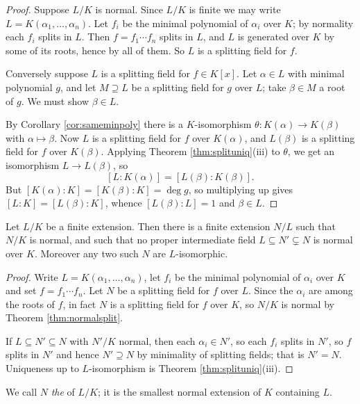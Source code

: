 \documentclass[a4paper]{scrartcl}
\begin{document}
\begin{proof}
	Suppose $L/K$ is normal. Since $L/K$ is finite we may write $L = K(\alpha_1, \dots, \alpha_n)$. Let $f_i$ be the minimal polynomial of $\alpha_i$ over $K$; by normality each $f_i$ splits in $L$. Then $f = f_1 \cdots f_n$ splits in $L$, and $L$ is generated over $K$ by some of its roots, hence by all of them. So $L$ is a splitting field for $f$.

	Conversely suppose $L$ is a splitting field for $f \in K[x]$. Let $\alpha \in L$ with minimal polynomial $g$, and let $M \supseteq L$ be a splitting field for $g$ over $L$; take $\beta \in M$ a root of $g$. We must show $\beta \in L$.

	By Corollary \ref{cor:sameminpoly} there is a $K$-isomorphism $\theta : K(\alpha) \to K(\beta)$ with $\alpha \mapsto \beta$. Now $L$ is a splitting field for $f$ over $K(\alpha)$, and $L(\beta)$ is a splitting field for $f$ over $K(\beta)$. Applying Theorem \ref{thm:splituniq}(iii) to $\theta$, we get an isomorphism $L \to L(\beta)$, so
	$$[L : K(\alpha)] = [L(\beta):K(\beta)].$$
	But $[K(\alpha):K] = [K(\beta):K] = \deg g$, so multiplying up gives $[L:K] = [L(\beta):K]$, whence $[L(\beta):L] = 1$ and $\beta \in L$.
\end{proof}

\begin{corollary}\label{cor:normalclosure}
	Let $L/K$ be a finite extension. Then there is a finite extension $N/L$ such that $N/K$ is normal, and such that no proper intermediate field $L \subseteq N' \subsetneq N$ is normal over $K$. Moreover any two such $N$ are $L$-isomorphic.
\end{corollary}

\begin{proof}
	Write $L = K(\alpha_1, \dots, \alpha_n)$, let $f_i$ be the minimal polynomial of $\alpha_i$ over $K$ and set $f = f_1\cdots f_n$. Let $N$ be a splitting field for $f$ over $L$. Since the $\alpha_i$ are among the roots of $f$, in fact $N$ is a splitting field for $f$ over $K$, so $N/K$ is normal by Theorem \ref{thm:normalsplit}.

	If $L \subseteq N' \subseteq N$ with $N'/K$ normal, then each $\alpha_i \in N'$, so each $f_i$ splits in $N'$, so $f$ splits in $N'$ and hence $N' \supseteq N$ by minimality of splitting fields; that is $N' = N$. Uniqueness up to $L$-isomorphism is Theorem \ref{thm:splituniq}(iii).
\end{proof}

We call $N$ \emph{the}  of $L/K$; it is the smallest normal extension of $K$ containing $L$.
\end{document}

